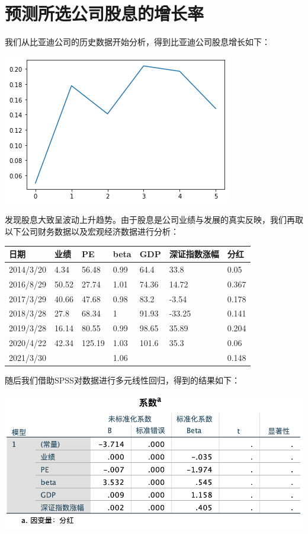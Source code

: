 \documentclass[UTF8]{ctexart}
\begin{document}
\section{预测所选公司股息的增长率}
我们从比亚迪公司的历史数据开始分析，得到比亚迪公司股息增长如下：
\begin{center}
\includegraphics[scale=0.6]{下载 (16).png}
\end{center}\par
发现股息大致呈波动上升趋势。由于股息是公司业绩与发展的真实反映，我们再取以下公司财务数据以及宏观经济数据进行分析：
\begin{center}
\begin{table}[h]
\centering
\begin{tabular}{@{}lllllll@{}}
\toprule
日期        & 业绩    & PE     & beta & GDP   & 深证指数涨幅 & 分红    \\ \midrule
2014/3/20 & 4.34  & 56.48  & 0.99 & 64.4  & 33.8   & 0.05  \\
2016/8/29 & 50.52 & 27.74  & 1.01 & 74.36 & 14.72  & 0.367 \\
2017/3/29 & 40.66 & 47.68  & 0.98 & 83.2  & -3.54  & 0.178 \\
2018/3/28 & 27.8  & 68.34  & 1    & 91.93 & -33.25 & 0.141 \\
2019/3/28 & 16.14 & 80.55  & 0.99 & 98.65 & 35.89  & 0.204 \\
2020/4/22 & 42.34 & 125.19 & 1.03 & 101.6 & 35.3   & 0.06  \\
2021/3/30 &       &        & 1.06 &       &        & 0.148 \\ \bottomrule
\end{tabular}
\end{table}
\end{center}\par
随后我们借助SPSS对数据进行多元线性回归\cite{ref6}，得到的结果如下：
\begin{center}
\includegraphics[scale=0.5]{截屏2021-06-17 上午11.48.29.png}
\end{center}\par
\end{document}

